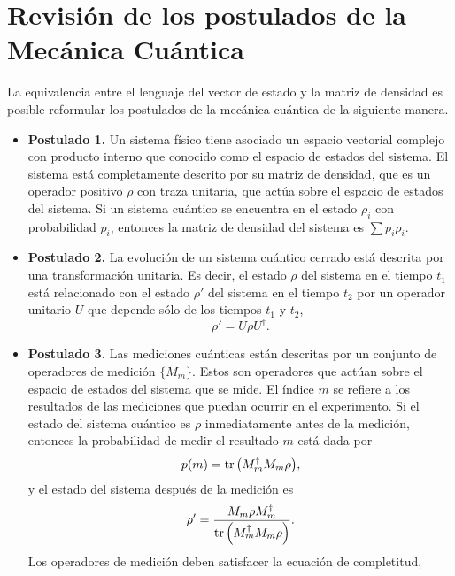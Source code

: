 \section{Revisión de los postulados de la Mecánica Cuántica} %
La equivalencia entre el lenguaje del vector de estado y la matriz de 
densidad es posible reformular los postulados de la mecánica cuántica 
de la siguiente manera.
\begin{itemize}
	\item[] \textbf{Postulado 1.} Un sistema físico tiene asociado un espacio vectorial complejo
	con producto interno que conocido como el espacio de estados del
	sistema. El sistema está completamente descrito por su matriz de densidad,
	que es un operador positivo $\rho$ con traza unitaria, que actúa sobre 
	el espacio de estados del sistema. Si un sistema cuántico se encuentra
	en el estado $\rho _i$ con probabilidad $p_i$, entonces la matriz de
	densidad del sistema es $\sum p_i\rho_i$.
	\item[] \textbf{Postulado 2.} La evolución de un sistema cuántico cerrado está descrita por una transformación
	unitaria. Es decir, el estado $\rho$ del sistema en el tiempo $t_1$ está 
	relacionado con el estado $\rho'$ del sistema en el tiempo $t_2$ por un operador
	unitario $U$ que depende sólo de los tiempos $t_1$ y $t_2$,
	\begin{equation}
	\rho'=U\rho U^{\dagger}.
	\label{eq:postulate1}
	\end{equation}
	\item[] \textbf{Postulado 3.} Las mediciones cuánticas están descritas
por un conjunto de 
	operadores de medición $\{M_m\}$. Estos son operadores que actúan sobre el espacio 
	de estados del sistema que se mide. El índice $m$ se refiere a los resultados
	de las mediciones que puedan ocurrir en el experimento. Si el estado del sistema
	cuántico es $\rho$ inmediatamente antes de la medición, entonces la probabilidad
	de medir el resultado $m$ está dada por
	\begin{equation}
	p(m)=\tr \qty(M_m^{\dagger}M_m\rho),
	\label{eq:postulate2_prob}
	\end{equation}						
	y el estado del sistema después de la medición es
	\begin{equation}
	\rho'=\frac{M_m\rho M_m^{\dagger}}{\tr \qty(M_m^{\dagger}M_m\rho)}.
	\label{eq:postulate2_rhoPrime}
	\end{equation}	
	Los operadores de medición deben satisfacer la ecuación de completitud,

\end{itemize}

